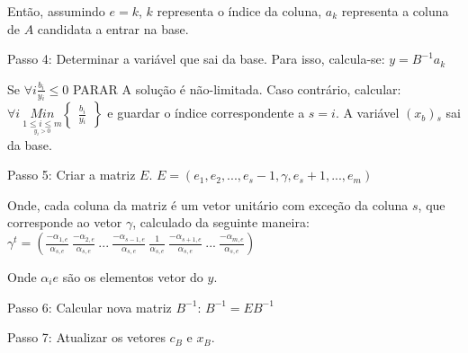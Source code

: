 Então, assumindo $e = k$, $k$ representa o índice da coluna, $a{_k}$ representa a coluna de $A$ candidata a entrar na base. 

Passo 4: Determinar a variável que sai da base. Para isso, calcula-se: $y=B^{-1}a{_k}$

Se $\forall i\frac{b{_i}}{y{_i}}\leq 0$ PARAR A solução é não-limitada. Caso contrário, calcular:
$\forall i\ \underset{\underset{y{_i}>0}{1\leq i\leq m}}{Min}\begin{Bmatrix}
\frac{b{_i}}{y{_i}}
\end{Bmatrix}$ e guardar o índice correspondente a $s = i$. A variável $(x{_b}){_s}$ sai da base.

Passo 5: Criar a matriz $E$.
$E=(e{_1},e{_2},...,e{_s-1},\gamma , e{_s+1},...,e{_m})$

Onde, cada coluna da matriz é um vetor unitário com exceção da coluna $s$, que corresponde ao vetor $\gamma$, calculado da seguinte maneira:
$\gamma^{t}=\left( \frac{-\alpha {_{1,e}}}{\alpha {_{s,e}}}\ \frac{-\alpha {_{2,e}}}{\alpha {_{s,e}}}\ ...\ \frac{-\alpha {_{s-1,e}}}{\alpha {_{s,e}}}\ \frac{1}{\alpha {_{s,e}}}\ \frac{-\alpha {_{s+1,e}}}{\alpha {_{s,e}}}\ ...\ \frac{-\alpha {_{m,e}}}{\alpha {_{s,e}}} \right )$

Onde $\alpha{_ie}$ são os elementos vetor do $y$.

Passo 6: Calcular nova matriz $B^{-1}$: $B^{-1} = EB^{-1}$

Passo 7: Atualizar os vetores $c{_B}$ e $x{_B}$.
